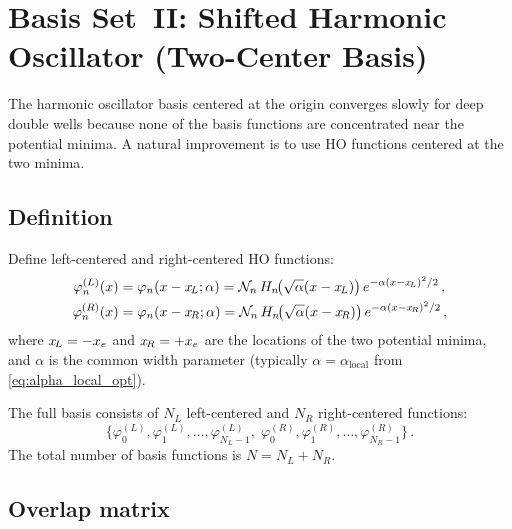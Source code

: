 \section{Basis Set~II: Shifted Harmonic Oscillator (Two-Center Basis)}\label{sec:shifted_HO}

The harmonic oscillator basis centered at the origin converges slowly for deep double wells
because none of the basis functions are concentrated near the potential minima.
A natural improvement is to use HO functions centered at the two minima.

\subsection{Definition}

Define left-centered and right-centered HO functions:
\begin{align}\label{eq:shifted_HO_def}
  \varphi_n^{(L)}(x) &= \varphi_n(x - \xL;\alpha) = \mathcal{N}_n\,H_n\!\bigl(\sqrt{\alpha}(x-\xL)\bigr)\,e^{-\alpha(x-\xL)^2/2}\,,\\
  \varphi_n^{(R)}(x) &= \varphi_n(x - \xR;\alpha) = \mathcal{N}_n\,H_n\!\bigl(\sqrt{\alpha}(x-\xR)\bigr)\,e^{-\alpha(x-\xR)^2/2}\,,
\end{align}
where $x_{\!L} = -x_e$ and $x_{\!R} = +x_e$ are the locations of the two potential minima,
and $\alpha$ is the common width parameter (typically $\alpha = \alpha_{\text{local}}$
from \cref{eq:alpha_local_opt}).

The full basis consists of $N_L$ left-centered and $N_R$ right-centered functions:
\begin{equation}
  \bigl\{\varphi_0^{(L)}, \varphi_1^{(L)}, \ldots, \varphi_{N_L-1}^{(L)},\;
         \varphi_0^{(R)}, \varphi_1^{(R)}, \ldots, \varphi_{N_R-1}^{(R)}\bigr\}\,.
\end{equation}
The total number of basis functions is $N = N_L + N_R$.

\subsection{Overlap matrix}\label{sec:shifted_overlap}

